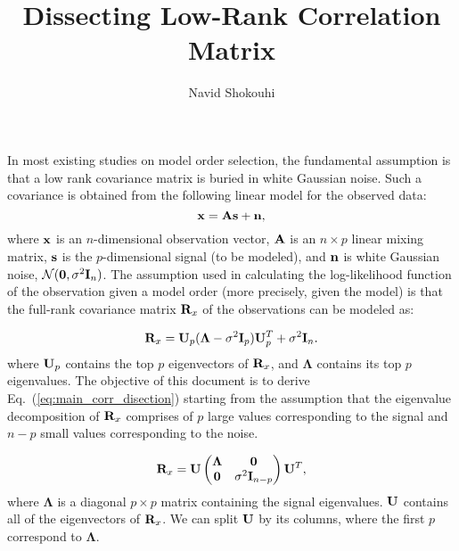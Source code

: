 \documentclass[10pt,technote,peerreview]{IEEEtran}
\begin{document}
\title{Dissecting Low-Rank Correlation Matrix}
\author{Navid Shokouhi}
\maketitle

\label{appendix}
In most existing studies on model order selection, the fundamental assumption is that a low rank covariance matrix is buried in white Gaussian noise. Such a covariance is obtained from the following linear model for the observed data: 
\begin{equation}
{\bf x} = {\bf As} + {\bf n},
\end{equation}
where ${\bf x}$ is an $n$-dimensional observation vector, ${\bf A}$ is an $n\times p$ linear mixing matrix, ${\bf s}$ is the $p$-dimensional signal (to be modeled), and ${\bf n}$ is white Gaussian noise, $\mathcal{N}({\bf 0},\sigma^2\textbf{I}_n)$. The assumption used in calculating the log-likelihood function of the observation given a model order (more precisely, given the model) is that the full-rank covariance matrix ${\bf R}_x$ of the observations can be modeled as: 

\begin{equation}
	\label{eq:main_corr_disection}
	{\bf R}_x = {\bf U}_p(\boldsymbol{\Lambda} - \sigma^2\textbf{I}_p){\bf U}^T_p + \sigma^2\textbf{I}_n.
\end{equation}
where ${\bf U}_p$ contains the top $p$ eigenvectors of ${\bf R}_x$, and $\boldsymbol{\Lambda}$ contains its top $p$ eigenvalues. The objective of this document is to derive Eq.~(\ref{eq:main_corr_disection}) starting from the assumption that the eigenvalue decomposition of ${\bf R}_x$ comprises of $p$ large values corresponding to the signal and $n-p$ small values corresponding to the noise. 

\begin{equation}
{\bf R}_x = {\bf U}
\begin{pmatrix}
\boldsymbol{\Lambda} & {\bf 0}\\
{\bf 0}				 & \sigma^2\textbf{I}_{n-p}\\
\end{pmatrix}
{\bf U}^T,
\end{equation}
where $\boldsymbol{\Lambda}$ is a diagonal $p\times p$ matrix containing the signal eigenvalues. ${\bf U}$ contains all of the eigenvectors of ${\bf R}_x$. We can split ${\bf U}$ by its columns, where the first $p$ correspond to $\boldsymbol{\Lambda}$. 
\end{document}
